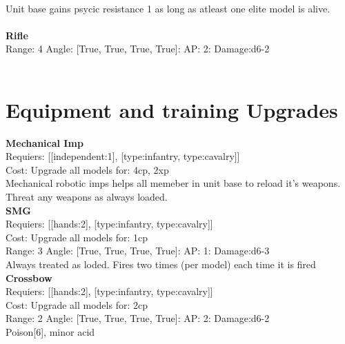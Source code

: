 \ \\
Unit base gains psycic resistance 1 as long as atleast one elite model is alive.\\ 

\ \\
{\bf Rifle } \\



Range: 4  Angle: [True, True, True, True]: AP: 2: Damage:d6-2 \\




 
\ \\

\section{Equipment and training Upgrades}{\bf Mechanical Imp } \\

Requiers: [[independent:1], [type:infantry, type:cavalry]] \\
Cost: Upgrade all models for: 4cp, 2xp \\
Mechanical robotic imps helps all memeber in unit base to reload it's weapons. Threat any weapons as always loaded.\\ 







{\bf SMG } \\

Requiers: [[hands:2], [type:infantry, type:cavalry]] \\
Cost: Upgrade all models for: 1cp \\


Range: 3  Angle: [True, True, True, True]: AP: 1: Damage:d6-3 \\
Always treated as loded. Fires two times (per model) each time it is fired\\ 






{\bf Crossbow } \\

Requiers: [[hands:2], [type:infantry, type:cavalry]] \\
Cost: Upgrade all models for: 2cp \\


Range: 2  Angle: [True, True, True, True]: AP: 2: Damage:d6-2 \\
Poison[6], minor acid\\ 






